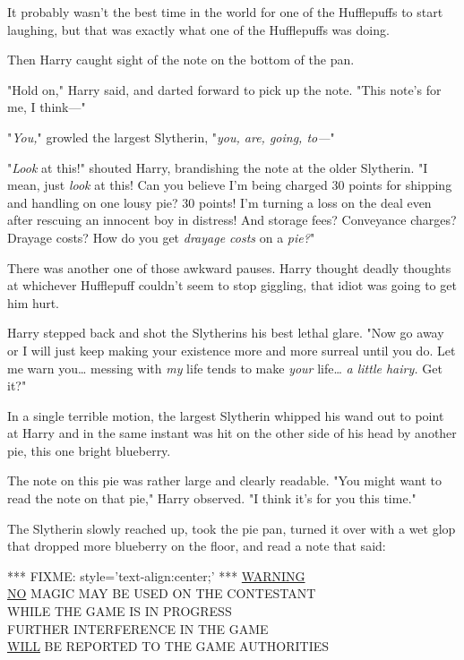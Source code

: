 It probably wasn't the best time in the world for one of the Hufflepuffs to 
start laughing, but that was exactly what one of the Hufflepuffs was doing.

Then Harry caught sight of the note on the bottom of the pan.

"Hold on," Harry said, and darted forward to pick up the note. "This note's for 
me, I think---"

"\emph{You,}" growled the largest Slytherin, "\emph{you, are, going, to---}"

"\emph{Look} at this!" shouted Harry, brandishing the note at the older 
Slytherin. "I mean, just \emph{look} at this! Can you believe I'm being charged 
30 points for shipping and handling on one lousy pie? 30 points! I'm turning a 
loss on the deal even after rescuing an innocent boy in distress! And storage 
fees? Conveyance charges? Drayage costs? How do you get \emph{drayage costs} on 
a \emph{pie?}"

There was another one of those awkward pauses. Harry thought deadly thoughts at 
whichever Hufflepuff couldn't seem to stop giggling, that idiot was going to 
get him hurt.

Harry stepped back and shot the Slytherins his best lethal glare. "Now go away 
or I will just keep making your existence more and more surreal until you do. 
Let me warn you{\ldots} messing with \emph{my} life tends to make \emph{your} 
life{\ldots} \emph{a little hairy.} Get it?"

In a single terrible motion, the largest Slytherin whipped his wand out to 
point at Harry and in the same instant was hit on the other side of his head by 
another pie, this one bright blueberry.

The note on this pie was rather large and clearly readable. "You might want to 
read the note on that pie," Harry observed. "I think it's for you this time."

The Slytherin slowly reached up, took the pie pan, turned it over with a wet 
glop that dropped more blueberry on the floor, and read a note that said:

*** FIXME: style='text-align:center;' ***
\underline{WARNING}\\
\underline{NO} MAGIC MAY BE USED ON THE CONTESTANT\\
WHILE THE GAME IS IN PROGRESS\\
FURTHER INTERFERENCE IN THE GAME\\
\underline{WILL} BE REPORTED TO THE GAME AUTHORITIES

